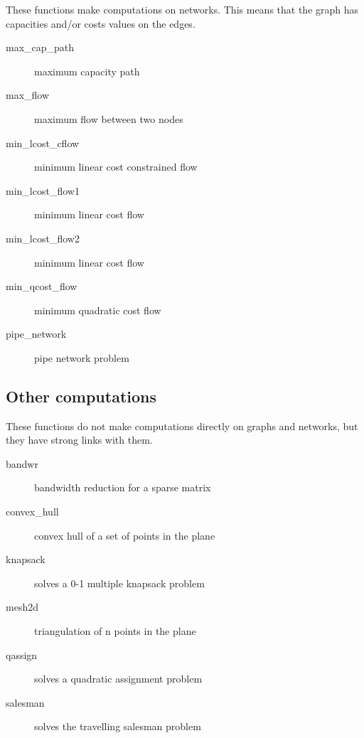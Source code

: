 \documentclass[11pt]{article}
\begin{document}
These functions make computations on networks. This means that the
graph has capacities and/or costs values on the edges.

\begin{description}
\item[max\_cap\_path] maximum capacity path
\item[max\_flow] maximum flow between two nodes
\item[min\_lcost\_cflow] minimum linear cost constrained flow
\item[min\_lcost\_flow1] minimum linear cost flow
\item[min\_lcost\_flow2] minimum linear cost flow
\item[min\_qcost\_flow] minimum quadratic cost flow
\item[pipe\_network] pipe network problem
\end{description}

\subsection{Other computations}

These functions do not make computations directly on graphs and
networks, but they have strong links with them.

\begin{description}
\item[bandwr] bandwidth reduction for a sparse matrix
\item[convex\_hull] convex hull of a set of points in the plane
\item[knapsack] solves a 0-1 multiple knapsack problem
\item[mesh2d] triangulation of n points in the plane
\item[qassign] solves a quadratic assignment problem
\item[salesman] solves the travelling salesman problem
\end{description}

\newpage

\tableofcontents

\listoffigures


\end{document}
